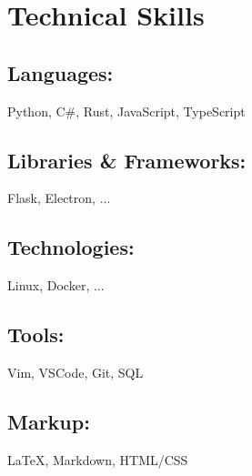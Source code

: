 \section{Technical Skills}

\subsection{Languages:} Python, C\#, Rust, JavaScript, TypeScript
\subsection{Libraries \& Frameworks:} Flask, Electron, ...
\subsection{Technologies:} Linux, Docker, ...
\subsection{Tools:} Vim, VSCode, Git, SQL
\subsection{Markup:} {\LaTeX}, Markdown, HTML/CSS

